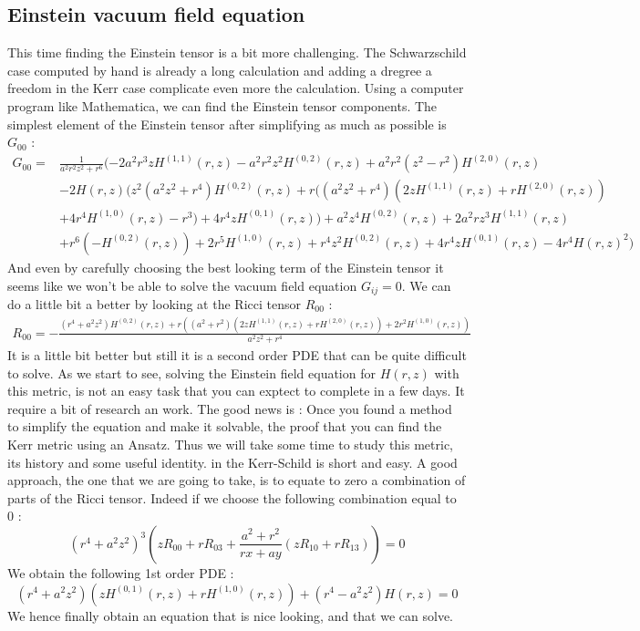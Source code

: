\documentclass[a4paper,12pt]{article}
\theoremstyle{definition}
\begin{document}
\subsection{Einstein vacuum field equation}
This time finding the Einstein tensor is a bit more challenging.
The Schwarzschild case computed by hand is already a long calculation and adding a dregree a freedom in the Kerr case complicate even more the calculation.
Using a computer program like Mathematica, we can find the Einstein tensor components.
The simplest element of the Einstein tensor after simplifying as much as possible is $G_{00}$ :
\begin{align*}
	G_{00} = &\frac{1}{a^2 r^2z^2+r^6}(-2 a^2 r^3 z H^{(1,1)}(r,z)-a^2 r^2 z^2 H^{(0,2)}(r,z)+a^2 r^2(z^2-r^2) H^{(2,0)}(r,z)\\
	&-2 H(r,z) (z^2 (a^2z^2+r^4) H^{(0,2)}(r,z)+r ((a^2 z^2+r^4)(2 z H^{(1,1)}(r,z)+r H^{(2,0)}(r,z))\\
	&+4r^4H^{(1,0)}(r,z)-r^3)+4 r^4 z H^{(0,1)}(r,z))+a^2 z^4H^{(0,2)}(r,z)+2 a^2 r z^3 H^{(1,1)}(r,z)\\
	&+r^6(-H^{(0,2)}(r,z))+2 r^5 H^{(1,0)}(r,z)+r^4 z^2H^{(0,2)}(r,z)+4 r^4 z H^{(0,1)}(r,z)-4 r^4 H(r,z)^2)
\end{align*}
And even by carefully choosing the best looking term of the Einstein tensor it seems like we won't be able to solve the vacuum field equation $G_{ij}=0$.
We can do a little bit a better by looking at the Ricci tensor $R_{00}$ :
\begin{align*}
	R_{00}=-\frac{(r^4+a^2z^2)H^{(0,2)}(r,z)+r
	((a^2+r^2) (2 z H^{(1,1)}(r,z)+r
	H^{(2,0)}(r,z))+2 r^2 H^{(1,0)}(r,z))}{a^2 z^2+r^4}
\end{align*}
It is a little bit better but still it is a second order PDE that can be quite difficult to solve.
As we start to see, solving the Einstein field equation for $H(r,z)$ with this metric, is not an easy task that you can exptect to complete in a few days.
It require a bit of research an work.
The good news is : Once you found a method to simplify the equation and make it solvable, the proof that you can find the Kerr metric using an Ansatz.
Thus we will take some time to study this metric, its history and some useful identity. in the Kerr-Schild is short and easy.
A good approach, the one that we are going to take, is to equate to zero a combination of parts of the Ricci tensor.
Indeed if we choose the following combination equal to $0$ :
\begin{equation*}
	(r^4+a^2z^2)^3(zR_{00}+rR_{03}+\frac{a^2+r^2}{rx+ay}(zR_{10}+rR_{13}))=0
\end{equation*}
We obtain the following 1st order PDE :
\begin{equation}\label{Kerr:equation}
	(r^4+a^2z^2)(z H^{(0,1)}(r,z)+rH^{(1,0)}(r,z))+(r^4-a^2 z^2) H(r,z)=0
\end{equation}
We hence finally obtain an equation that is nice looking, and that we can solve.
\end{document}
